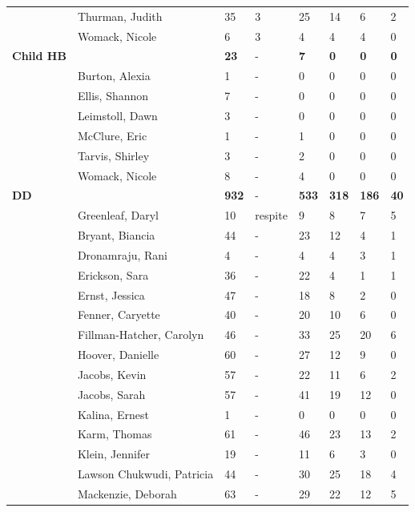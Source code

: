 \documentclass{article}\usepackage[]{graphicx}\usepackage[]{color}
\begin{document}
{\begin{longtable} { >{\raggedright}p{}p{}p{}p{}p{}p{}p{}p{}}
   & Thurman, Judith & 35 & 3 & 25 & 14 & 6 & 2 \\ 
   & Womack, Nicole & 6 & 3 & 4 & 4 & 4 & 0 \\ 
   \hline
\textbf{Child HB} &  & \textbf{23} & - & \textbf{7} & \textbf{0} & \textbf{0} & \textbf{0} \\ 
   \rowcolor[gray]{0.90} & Burton, Alexia & 1 & - & 0 & 0 & 0 & 0 \\ 
   \rowcolor[gray]{0.90} & Ellis, Shannon & 7 & - & 0 & 0 & 0 & 0 \\ 
   & Leimstoll, Dawn & 3 & - & 0 & 0 & 0 & 0 \\ 
   & McClure, Eric & 1 & - & 1 & 0 & 0 & 0 \\ 
   & Tarvis, Shirley & 3 & - & 2 & 0 & 0 & 0 \\ 
   \rowcolor[gray]{0.90} & Womack, Nicole & 8 & - & 4 & 0 & 0 & 0 \\ 
   \hline
\textbf{DD} &  & \textbf{932} & - & \textbf{533} & \textbf{318} & \textbf{186} & \textbf{40} \\ 
   \rowcolor[gray]{0.90} & Greenleaf, Daryl & 10 & respite & 9 & 8 & 7 & 5 \\ 
   & Bryant, Biancia & 44 & - & 23 & 12 & 4 & 1 \\ 
   & Dronamraju, Rani & 4 & - & 4 & 4 & 3 & 1 \\ 
   & Erickson, Sara & 36 & - & 22 & 4 & 1 & 1 \\ 
   \rowcolor[gray]{0.90} & Ernst, Jessica & 47 & - & 18 & 8 & 2 & 0 \\ 
   \rowcolor[gray]{0.90} & Fenner, Caryette & 40 & - & 20 & 10 & 6 & 0 \\ 
   \rowcolor[gray]{0.90} & Fillman-Hatcher, Carolyn & 46 & - & 33 & 25 & 20 & 6 \\ 
   & Hoover, Danielle & 60 & - & 27 & 12 & 9 & 0 \\ 
   & Jacobs, Kevin & 57 & - & 22 & 11 & 6 & 2 \\ 
   & Jacobs, Sarah & 57 & - & 41 & 19 & 12 & 0 \\ 
   \rowcolor[gray]{0.90} & Kalina, Ernest & 1 & - & 0 & 0 & 0 & 0 \\ 
   \rowcolor[gray]{0.90} & Karm, Thomas & 61 & - & 46 & 23 & 13 & 2 \\ 
   \rowcolor[gray]{0.90} & Klein, Jennifer & 19 & - & 11 & 6 & 3 & 0 \\ 
   & Lawson Chukwudi, Patricia & 44 & - & 30 & 25 & 18 & 4 \\ 
   & Mackenzie, Deborah & 63 & - & 29 & 22 & 12 & 5 \\ 

\end{longtable}}
\end{document}
